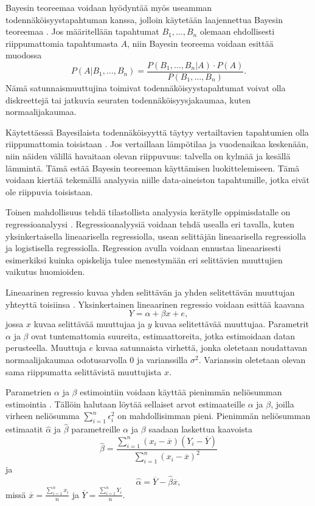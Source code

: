 Bayesin teoreemaa voidaan hyödyntää myös useamman todennäköisyystapahtuman kanssa, jolloin käytetään laajennettua Bayesin teoreemaa \citep{natinggaDataScienceAlgorithms2018}. Jos määritellään tapahtumat $B_1, \ldots, B_n$ olemaan ehdollisesti riippumattomia tapahtumasta $A$, niin Bayesin teoreema voidaan esittää muodossa $$P(A | B_1, \ldots, B_n) = \frac{P(B_1, \ldots, B_n | A) \cdot P(A)}{P(B_1, \ldots, B_n)}.$$ Nämä satunnaismuuttujina toimivat todennäköisyystapahtumat voivat olla diskreettejä tai jatkuvia seuraten todennäköisyysjakaumaa, kuten normaalijakaumaa.

Käytettäessä Bayesilaista todennäköisyyttä täytyy vertailtavien tapahtumien olla riippumattomia toisistaan \citep{natinggaDataScienceAlgorithms2018}. Jos vertaillaan lämpötilaa ja vuodenaikaa keskenään, niin näiden välillä havaitaan olevan riippuvuus: talvella on kylmää ja kesällä lämmintä. Tämä estää Bayesin teoreeman käyttämisen luokittelemiseen. Tämä voidaan kiertää tekemällä analyysia niille data-aineiston tapahtumille, jotka eivät ole riippuvia toisistaan.

Toinen mahdollisuus tehdä tilastollista analyysia kerätylle oppimisdatalle on regressioanalyysi \citep{songLearningAnalyticsEducational2018, romeroEducationalDataMining2010, papamitsiouLearningAnalyticsEducational2014}. Regressioanalyysiä voidaan tehdä usealla eri tavalla, kuten yksinkertaisella lineaarisella regressiolla, usean selittäjän lineaarisella regressiolla ja logistisella regressiolla. Regression avulla voidaan ennustaa lineaarisesti esimerkiksi kuinka opiskelija tulee menestymään eri selittävien muuttujien vaikutus huomioiden.

Lineaarinen regressio kuvaa yhden selittävän ja yhden selitettävän muuttujan yhteyttä toisiinsa \citep{rossIntroductoryStatistics2017}. Yksinkertainen lineaarinen regressio voidaan esittää kaavana $$Y = \alpha + \beta x + e,$$ jossa $x$ kuvaa selittävää muuttujaa ja $y$ kuvaa selitettävää muuttujaa. Parametrit $\alpha$ ja $\beta$ ovat tuntemattomia suureita, estimaattoreita, jotka estimoidaan datan perusteella. Muuttuja $e$ kuvaa satunnaista virhettä, jonka oletetaan noudattavan normaalijakaumaa odotusarvolla $0$ ja varianssilla $\sigma^2$. Varianssin oletetaan olevan sama riippumatta selittävistä muuttujista $x$.

Parametrien $\alpha$ ja $\beta$ estimointiin voidaan käyttää pienimmän neliösumman estimointia \citep{rossIntroductoryStatistics2017}. Tällöin halutaan löytää sellaiset arvot estimaateille $\alpha$ ja $\beta$, joilla virheen neliösumma $\sum^n_{i=1} \epsilon^2_i$ on mahdollisimman pieni. Pienimmän neliösumman estimaatit $\hat{\alpha}$ ja $\hat{\beta}$ parametreille $\alpha$ ja $\beta$ saadaan laskettua kaavoista $$\hat{\beta} = \frac{\sum^n_{i=1}(x_i - \overline{x})(Y_i - \overline{Y})}{\sum^n_{i=1}(x_i - \overline{x})^2}$$ ja $$\hat{\alpha} = \overline{Y} - \hat{\beta}\overline{x},$$ missä $\overline{x} = \frac{\sum^n_{i=1}x_i}{n}$ ja $\overline{Y} = \frac{\sum^n_{i=1}Y_i}{n}$.

